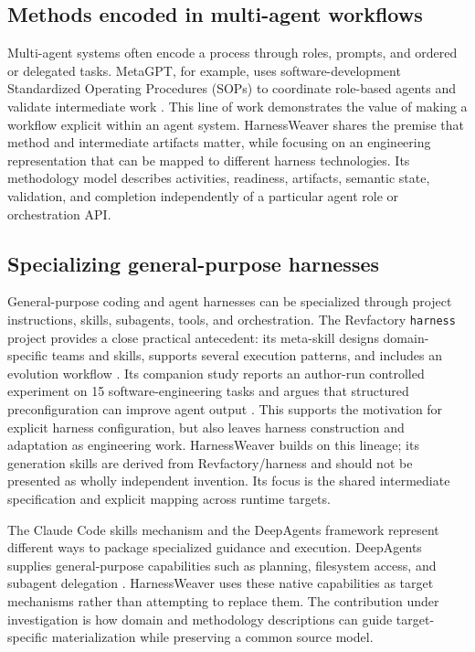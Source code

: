 \documentclass[10pt,conference]{IEEEtran}
\begin{document}
\subsection{Methods encoded in multi-agent workflows}

Multi-agent systems often encode a process through roles, prompts, and ordered or delegated tasks. MetaGPT, for example, uses software-development Standardized Operating Procedures (SOPs) to coordinate role-based agents and validate intermediate work \cite{metagpt}. This line of work demonstrates the value of making a workflow explicit within an agent system. HarnessWeaver shares the premise that method and intermediate artifacts matter, while focusing on an engineering representation that can be mapped to different harness technologies. Its methodology model describes activities, readiness, artifacts, semantic state, validation, and completion independently of a particular agent role or orchestration API.

\subsection{Specializing general-purpose harnesses}

General-purpose coding and agent harnesses can be specialized through project instructions, skills, subagents, tools, and orchestration. The Revfactory \texttt{harness} project provides a close practical antecedent: its meta-skill designs domain-specific teams and skills, supports several execution patterns, and includes an evolution workflow \cite{revfactory}. Its companion study reports an author-run controlled experiment on 15 software-engineering tasks and argues that structured preconfiguration can improve agent output \cite{hwang}. This supports the motivation for explicit harness configuration, but also leaves harness construction and adaptation as engineering work. HarnessWeaver builds on this lineage; its generation skills are derived from Revfactory/harness and should not be presented as wholly independent invention. Its focus is the shared intermediate specification and explicit mapping across runtime targets.

The Claude Code skills mechanism and the DeepAgents framework represent different ways to package specialized guidance and execution. DeepAgents supplies general-purpose capabilities such as planning, filesystem access, and subagent delegation \cite{deepagents}. HarnessWeaver uses these native capabilities as target mechanisms rather than attempting to replace them. The contribution under investigation is how domain and methodology descriptions can guide target-specific materialization while preserving a common source model.
\end{document}
